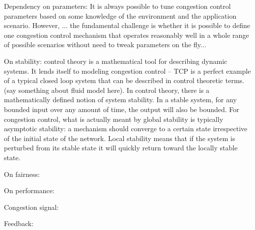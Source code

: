 Dependency on parameters: It is always possible to tune congestion control
parameters based on some knowledge of the environment and the application
scenario. However, ... the fundamental challenge is whether it is possible to
define one congestion control mechanism that operates reasonably well in a whole
range of possible scenarios without need to tweak parameters on the fly...


On stability: control theory is a mathematical tool for describing dynamic
systems. It lends itself to modeling congestion control -- TCP is a perfect
example of a typical closed loop system that can be described in control
theoretic terms. (say something about fluid model here). In control theory,
there is a mathematically defined notion of system stability.  In a stable
system, for any bounded input over any amount of time, the output will also be
bounded.  For congestion control, what is actually meant by global  stability is
typically asymptotic stability: a mechanism should converge to a certain state
irrespective of the initial state of the network. Local stability means that if
the system is perturbed from its stable state it will quickly return toward the
locally stable state.


On fairness: 


On performance:

Congestion signal:

Feedback:

